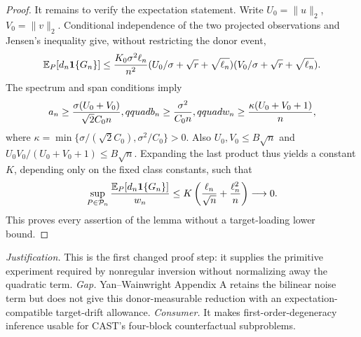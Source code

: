 \documentclass{article}
\begin{document}
\begin{proof}
It remains to verify the expectation statement.  Write \(U_0=\|u\|_2\), \(V_0=\|v\|_2\).  Conditional independence of the two projected observations and Jensen's inequality give, without restricting the donor event,
\[
 \mathbb E_P[d_n\mathbf1\{G_n\}]
 \le {K_0\sigma^2\ell_n\over n^2}
 (U_0/\sigma+\sqrt r+\sqrt{\ell_n})
 (V_0/\sigma+\sqrt r+\sqrt{\ell_n}).
\]
The spectrum and span conditions imply
\[
 a_n\ge {\sigma(U_0+V_0)\over\sqrt2C_0n},qquad
 b_n\ge {\sigma^2\over C_0n},qquad
 w_n\ge {\kappa(U_0+V_0+1)\over n},
\]
where \(\kappa=\min\{\sigma/(\sqrt2C_0),\sigma^2/C_0\}>0\).  Also \(U_0,V_0\le B\sqrt n\) and
\(U_0V_0/(U_0+V_0+1)\le B\sqrt n\).  Expanding the last product thus yields a constant \(K\), depending only on the fixed class constants, such that
\[
 \sup_{P\in\mathcal P_n}{\mathbb E_P[d_n\mathbf1\{G_n\}]\over w_n}
 \le K\left({\ell_n\over\sqrt n}+{\ell_n^2\over n}\right)\longrightarrow0.
\]
This proves every assertion of the lemma without a target-loading lower bound.
\end{proof}
\par\smallskip\noindent \textit{Justification.} This is the first changed proof step: it supplies the primitive experiment required by nonregular inversion without normalizing away the quadratic term. \textit{Gap.} Yan--Wainwright Appendix A retains the bilinear noise term but does not give this donor-measurable reduction with an expectation-compatible target-drift allowance. \textit{Consumer.} It makes first-order-degeneracy inference usable for CAST's four-block counterfactual subproblems.
\end{document}
